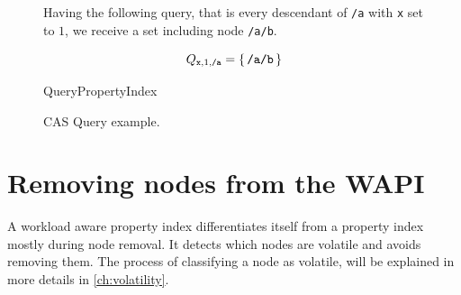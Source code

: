 \documentclass[abstracton,12pt]{scrreprt}
\begin{document}
\begin{figure}[h]
\begin{multicols}{2}
\begin{multicols}{2}
\begin{footnotesize}
                \vspace{5mm}
                Having the following query, that is every descendant of \texttt{/a} with \texttt{x} set to $1$,
                we receive a set including node \texttt{/a/b}.
            \end{footnotesize}
            \begin{large}
                $$ Q_{\texttt{x}, 1, \texttt{/a}} = \{\,\texttt{\normalsize/a/b}\,\}$$
            \end{large}
        \end{multicols}
        \columnbreak
        \begin{algorithm}[H]
            \DontPrintSemicolon
            \begin{scriptsize}
                \label{algo:query_pi}
                \caption{QueryPropertyIndex}
            \end{scriptsize}
        \end{algorithm}
    \end{multicols}
    \caption{CAS Query example.}
    \label{fig:cas_query}
\end{figure}

\section{Removing nodes from the WAPI}

A workload aware property index differentiates itself from a property index mostly during node removal.
It detects which nodes are volatile and avoids removing them.
The process of classifying a node as volatile, will be explained in more details in \cref{ch:volatility}.
\end{document}
